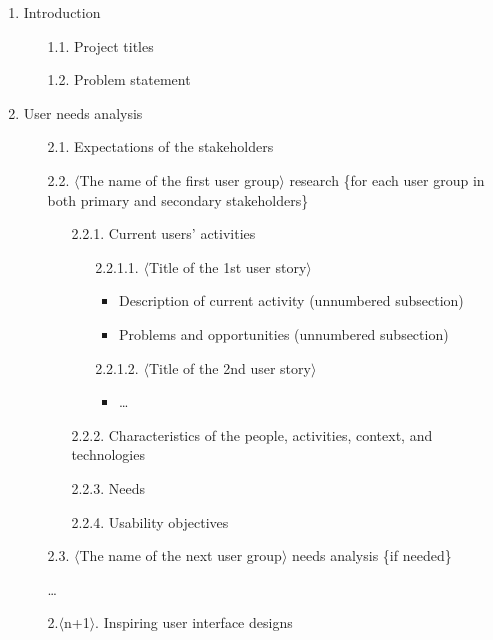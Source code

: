 \documentclass[]{VUMIFTemplateClass}
\begin{document}
\begin{enumerate}
    \item Introduction \checkmark
    \begin{enumerate}
        \item[1.1.] Project titles \checkmark
        \item[1.2.] Problem statement \checkmark
    \end{enumerate}
    
    \item User needs analysis
    \begin{enumerate}
        \item[2.1.] Expectations of the stakeholders \checkmark
        \item[2.2.] $\langle$The name of the first user group$\rangle$ research \{for each user group in both primary and secondary stakeholders\} \checkmark
        \begin{enumerate}
            \item[2.2.1.] Current users' activities \checkmark
            \begin{enumerate}
                \item[2.2.1.1.] $\langle$Title of the 1st user story$\rangle$ \checkmark
                \begin{itemize}
                    \item Description of current activity (unnumbered subsection) \checkmark
                    \item Problems and opportunities (unnumbered subsection) \checkmark
                \end{itemize}
                \item[2.2.1.2.] $\langle$Title of the 2nd user story$\rangle$ \checkmark
                \begin{itemize}
                    \item \ldots \checkmark
                \end{itemize}
            \end{enumerate}
            \item[2.2.2.] Characteristics of the people, activities, context, and technologies \checkmark
            \item[2.2.3.] Needs
            \item[2.2.4.] Usability objectives
        \end{enumerate}
        \item[2.3.] $\langle$The name of the next user group$\rangle$ needs analysis \{if needed\}
        \item[] \ldots
        \item[2.$\langle$n+1$\rangle$.] Inspiring user interface designs
    \end{enumerate}
\end{enumerate}
\end{document}
